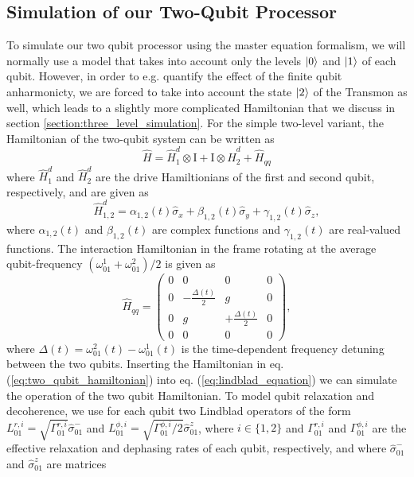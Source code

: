 \subsection{Simulation of our Two-Qubit Processor}

To simulate our two qubit processor using the master equation formalism, we will normally use a model that takes into account only the levels $\left| 0 \right>$ and $\left| 1 \right>$ of each qubit. However, in order to e.g. quantify the effect of the finite qubit anharmonicty, we are forced to take into account the state $\left| 2 \right>$ of the Transmon as well, which leads to a slightly more complicated Hamiltonian that we discuss in section \ref{section:three_level_simulation}. For the simple two-level variant, the Hamiltonian of the two-qubit system can be written as
%
\begin{equation}
\hat{H} = \hat{H}_1^d\otimes\mathrm{I}+\mathrm{I}\otimes\hat{H}_2^d+\hat{H}_{qq} \label{eq:two_qubit_hamiltonian}
\end{equation}
%
where $\hat{H}_1^d$ and $\hat{H}_2^d$ are the drive Hamiltionians of the first and second qubit, respectively, and are given as
%
\begin{equation}
\hat{H}_{1,2}^d = \alpha_{1,2}(t)\hat{\sigma}_x+\beta_{1,2}(t)\hat{\sigma}_y+\gamma_{1,2}(t)\hat{\sigma}_z,
\end{equation}
%
where $\alpha_{1,2}(t)$ and $\beta_{1,2}(t)$ are complex functions and $\gamma_{1,2}(t)$ are real-valued functions. The interaction Hamiltonian in the frame rotating at the average qubit-frequency $(\omega_{01}^1+\omega_{01}^2)/2$ is given as
%
\begin{equation}
\hat{H}_{qq} = \left(\begin{array}{cccc}0 & 0 & 0 & 0 \\ 0 & -\frac{\Delta(t)}{2} & g & 0 \\ 0 & g & +\frac{\Delta(t)}{2} & 0 \\ 0 & 0 & 0 & 0 \end{array}\right),
\end{equation}
%
where $\Delta(t)=\omega_{01}^2(t)-\omega_{01}^1(t)$ is the time-dependent frequency detuning between the two qubits. Inserting the Hamiltonian in eq. (\ref{eq:two_qubit_hamiltonian}) into eq. (\ref{eq:lindblad_equation}) we can simulate the operation of the two qubit Hamiltonian. To model qubit relaxation and decoherence, we use for each qubit two Lindblad operators of the form $L_{01}^{r,i}=\sqrt{\Gamma_{01}^{r,i}}\hat{\sigma}_{01}^-$ and $L_{01}^{\phi,i}=\sqrt{\Gamma_{01}^{\phi,i}/2}\hat{\sigma}_{01}^z$, where $i\in\{1,2\}$ and $\Gamma_{01}^{r,i}$ and $\Gamma_{01}^{\phi,i}$ are the effective relaxation and dephasing rates of each qubit, respectively, and where $\hat{\sigma}_{01}^-$ and $\hat{\sigma}_{01}^z$ are matrices
